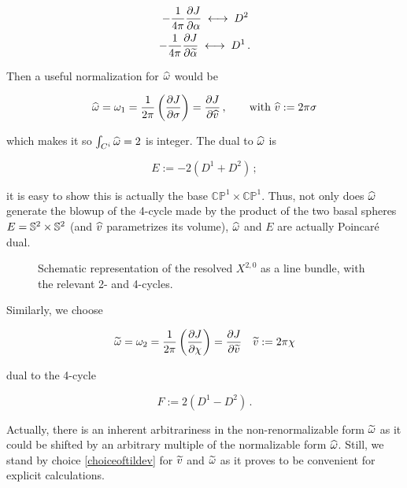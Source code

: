 \begin{align}
	- \frac{1}{4\pi} \frac{\partial J}{\partial\alpha} \; \longleftrightarrow \; D^2 \, \\ - \frac{1}{4\pi}\frac{\partial J}{\partial\widetilde{\alpha}} \; \longleftrightarrow \; D^1\,.
	\label{}
\end{align}

Then a useful normalization for $\widehat{\omega}$ would be

\begin{align}
	\widehat{\omega} = \omega_1 = \frac{1}{2\pi}\left( \frac{\partial J}{\partial\sigma} \right) = \frac{\partial J}{\partial\widehat{v}}\,, \quad\quad \text{with } \widehat{v} := 2\pi \sigma
	\label{}
\end{align}

which makes it so $\int_{C^i} \widehat{\omega} = 2$ is integer. The dual to $\widehat{\omega} $ is 

\begin{equation}\label{defE}
	E := -2(D^1+D^2)\,;
\end{equation}

it is easy to show this is actually the base $\mathbb{CP}^1 \times \mathbb{CP}^1$. Thus, not only does $\widehat{\omega}$ generate the blowup of the 4-cycle made by the product of the two basal spheres $E = \mathbb{S}^2 \times \mathbb{S}^2 $ (and $\widehat{v}$ parametrizes its volume), $\widehat{\omega}$ and $E$ are actually Poincar\'e dual.

\begin{figure}[H]
\centering
\def\svgwidth{100pt}
\captionsetup{width=0.8\textwidth}

\caption{Schematic representation of the resolved $X^{2,0}$ as a line bundle, with the relevant 2- and 4-cycles.}
\end{figure}

Similarly, we choose

\begin{align}
	\widetilde{\omega} = \omega_2 = \frac{1}{2\pi} \left( \frac{\partial J}{\partial\chi} \right) = \frac{\partial J}{\partial\widetilde{v}} && \widetilde{v} := 2\pi\chi
	\label{choiceoftildev}
\end{align}

dual to the 4-cycle 

\begin{equation}
	F := 2 (D^1 - D^2)\,.
	\label{defF}
\end{equation}

Actually, there is an inherent arbitrariness in the non-renormalizable form $\widetilde{\omega}$ as it could be shifted by an arbitrary multiple of the normalizable form $\widehat{\omega}$. Still, we stand by choice \eqref{choiceoftildev} for $\widetilde{v}$ and $\widetilde{\omega}$ as it proves to be convenient for explicit calculations.


